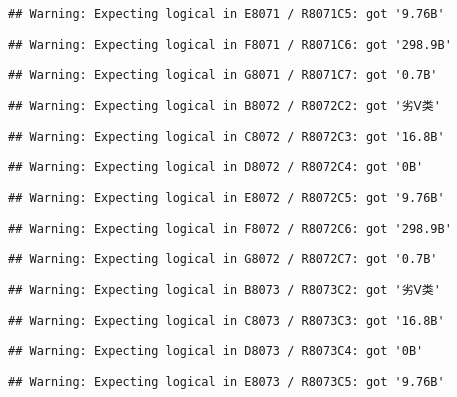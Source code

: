 \documentclass[
]{article}
\begin{document}
\begin{verbatim}
## Warning: Expecting logical in E8071 / R8071C5: got '9.76B'
\end{verbatim}

\begin{verbatim}
## Warning: Expecting logical in F8071 / R8071C6: got '298.9B'
\end{verbatim}

\begin{verbatim}
## Warning: Expecting logical in G8071 / R8071C7: got '0.7B'
\end{verbatim}

\begin{verbatim}
## Warning: Expecting logical in B8072 / R8072C2: got '劣Ⅴ类'
\end{verbatim}

\begin{verbatim}
## Warning: Expecting logical in C8072 / R8072C3: got '16.8B'
\end{verbatim}

\begin{verbatim}
## Warning: Expecting logical in D8072 / R8072C4: got '0B'
\end{verbatim}

\begin{verbatim}
## Warning: Expecting logical in E8072 / R8072C5: got '9.76B'
\end{verbatim}

\begin{verbatim}
## Warning: Expecting logical in F8072 / R8072C6: got '298.9B'
\end{verbatim}

\begin{verbatim}
## Warning: Expecting logical in G8072 / R8072C7: got '0.7B'
\end{verbatim}

\begin{verbatim}
## Warning: Expecting logical in B8073 / R8073C2: got '劣Ⅴ类'
\end{verbatim}

\begin{verbatim}
## Warning: Expecting logical in C8073 / R8073C3: got '16.8B'
\end{verbatim}

\begin{verbatim}
## Warning: Expecting logical in D8073 / R8073C4: got '0B'
\end{verbatim}

\begin{verbatim}
## Warning: Expecting logical in E8073 / R8073C5: got '9.76B'
\end{verbatim}
\end{document}
